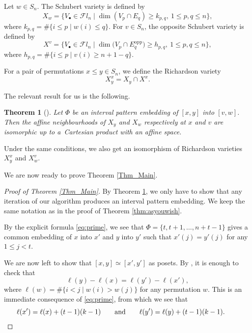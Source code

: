 \documentclass[pdftex]{sigma}
\numberwithin{equation}{section}
\newtheorem{Theorem}{Theorem}[section]
\begin{document}
Let $w\in S_n$. The Schubert variety is defined by
\begin{equation}\label{Eqn_SchubertVar}
X_w= \big\{V_\bullet\in\mathcal{F}l_n\mid
\dim(V_p\cap E_q)\geq k_{p,q}, \ 1\leq p,q\leq n \big\},
\end{equation}
where $k_{p,q}=\#\{i\leq p\mid w(i)\leq q\}$.
For $v\in S_n$, the opposite Schubert variety is defined by
\begin{equation*}%
X^v= \big\{V_\bullet\in\mathcal{F}l_n\mid
\dim\big(V_p\cap E^{\textrm{opp}}_q\big)\geq h_{p,q}, \ 1\leq p,q\leq n \big\},
\end{equation*}
where $h_{p,q}=\#\{i\leq p\mid v(i)\geq n+1-q\}$.

For a pair of permutations $x\leq y\in S_n$, we define the Richardson variety
\[
 X^x_y=X_y\cap X^x.
\]

The relevant result for us is the following.

\begin{Theorem}[{\cite[Theorem 4.2]{wooyong}}]\label{Thm_WY} Let $\Phi$ be an interval pattern embedding of $[x,y]$ into $[v,w]$. Then the affine neighbourhoods of $X_y$ and $X_w$ respectively at $x$ and $v$ are isomorphic up to a~Cartesian product with an affine space.
\end{Theorem}

\begin{Remark}
Under the same conditions, we also get an isomorphism of Richardson varieties $X_y^x$ and $X_w^v$.
\end{Remark}

We are now ready to prove Theorem \ref{Thm_Main}.

\begin{proof}[Proof of Theorem \ref{Thm_Main}] By Theorem \ref{Thm_WY}, we only have to show that any iteration of our algorithm produces an interval pattern embedding. We keep the same notation as in the proof of Theorem \ref{thm:asyouwish}.

 By the explicit formula \eqref{eq:prime}, we see that $\Phi=\{t, t+1, \dots, n+t-1\}$ gives a common embedding of $x$ into $x'$ and $y$ into $y'$ such that $x'(j)=y'(j)$ for any $1\leq j<t$.

We are now left to show that $[x,y]\simeq [x',y']$ as posets. By \cite[Lemma 2.1]{wooyong}, it is enough to check that
\[
\ell(y)-\ell(x)=\ell(y')-\ell(x'),
\]
where $\ell(w)=\#\{i<j\mid w(i)>w(j)\}$ for any permutation $w$. This is an immediate consequence of \eqref{eq:prime}, from which we see that
\[\ell(x')=\ell(x)+(t-1)(k-1) \qquad\hbox{and}\qquad\ell(y')=\ell(y)+(t-1)(k-1).\tag*{\qed}\]\renewcommand{\qed}{}
\end{proof}
\end{document}

